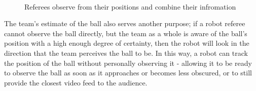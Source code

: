 \documentclass[runningheads,a4paper]{llncs}
\begin{document}
\begin{figure}
  \centering
  ~                
  ~
  \caption{Referees observe from their positions and combine their infromation}
  \label{fig:TeamUpdates}
\end{figure}

The team's estimate of the ball also serves another purpose; if a robot referee cannot observe the ball directly, but the team as a whole is aware of the ball's position with a high enough degree of certainty, then the robot will look in the direction that the team perceives the ball to be. In this way, a robot can track the position of the ball without personally observing it - allowing it to be ready to observe the ball as soon as it approaches or becomes less obscured, or to still provide the closest video feed to the audience.
\end{document}
